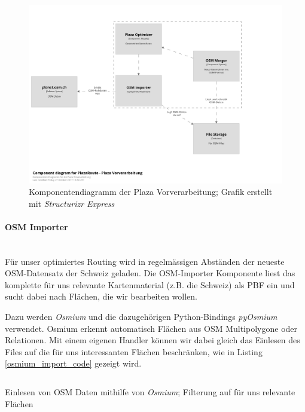 \begin{figure}[ht]
\centering
\includegraphics[width=1\linewidth]{projectdoc/img/component_diagram_plaza-vorverarbeitung.png}
\caption[Komponentendiagramm Vorverarbeitung]{Komponentendiagramm der Plaza Vorverarbeitung; Grafik erstellt mit \emph{Structurizr Express}\cite{structurizr}}
\label{fig:component_diagram_vorverarbeitung}
\end{figure}


\paragraph{OSM Importer}\label{par:OSM Importer}~\\
Für unser optimiertes Routing wird in regelmässigen Abständen der neueste \ac{OSM}-Datensatz \cite{osm_data_switzerland} der Schweiz geladen. Die \acs{OSM}-Importer Komponente liest das komplette für uns relevante Kartenmaterial (z.B. die Schweiz) als \ac{PBF} ein und sucht dabei nach Flächen, die wir bearbeiten wollen.

Dazu werden \emph{Osmium} und die dazugehörigen Python-Bindings \emph{pyOsmium}\cite{pyosmium} verwendet. Osmium erkennt automatisch Flächen aus \ac{OSM} Multipolygone oder Relationen. Mit einem eigenen Handler können wir dabei gleich das Einlesen des Files auf die für uns interessanten Flächen beschränken, wie in Listing \ref{osmium_import_code} gezeigt wird.


\begin{listing}[ht]
    \inputminted{python}{projectdoc/listing/osmium_handler.py}
    \caption[Einlesen OSM-Daten mit Osmium]{Einlesen von OSM Daten mithilfe von \emph{Osmium}; Filterung auf für uns relevante Flächen}
    \label{osmium_import_code}
\end{listing}

